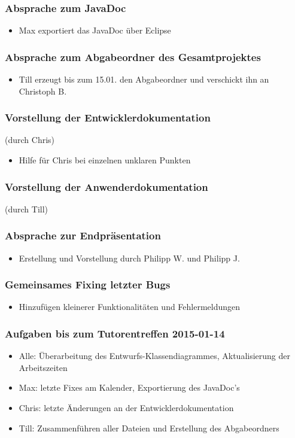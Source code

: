 \documentclass[12pt,a4paper]{article}
\begin{document}
\subsubsection*{Absprache zum JavaDoc}
\begin{itemize}
\item Max exportiert das JavaDoc über Eclipse
\end{itemize}

\subsubsection*{Absprache zum Abgabeordner des Gesamtprojektes}
\begin{itemize}
\item Till erzeugt bis zum 15.01. den Abgabeordner und verschickt ihn an Christoph B.
\end{itemize}

\subsubsection*{Vorstellung der Entwicklerdokumentation}
(durch Chris)
\begin{itemize}
\item Hilfe für Chris bei einzelnen unklaren Punkten
\end{itemize}

\subsubsection*{Vorstellung der Anwenderdokumentation}
(durch Till)

\subsubsection*{Absprache zur Endpräsentation}
\begin{itemize}
\item Erstellung und Vorstellung durch Philipp W. und Philipp J.
\end{itemize}

\subsubsection*{Gemeinsames Fixing letzter Bugs}
\begin{itemize}
\item Hinzufügen kleinerer Funktionalitäten und Fehlermeldungen
\end{itemize}

\subsubsection*{Aufgaben bis zum Tutorentreffen 2015-01-14}
\begin{itemize}
\item Alle: Überarbeitung des Entwurfs-Klassendiagrammes, Aktualisierung der Arbeitszeiten
\item Max: letzte Fixes am Kalender, Exportierung des JavaDoc's
\item Chris: letzte Änderungen an der Entwicklerdokumentation
\item Till: Zusammenführen aller Dateien und Erstellung des Abgabeordners
\end{itemize}
\end{document}
